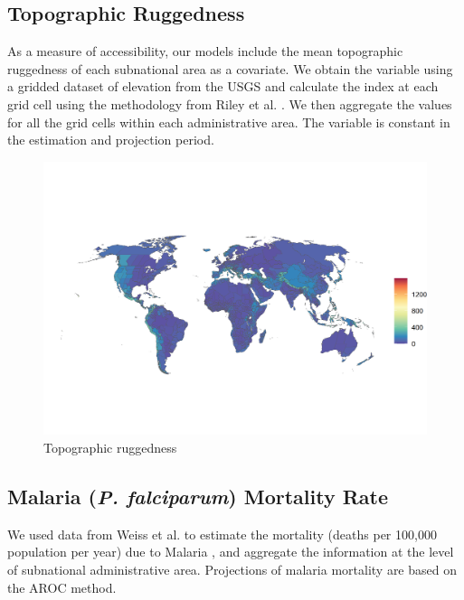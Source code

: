 \documentclass{article}
\begin{document}
\pagebreak
\subsection{Topographic Ruggedness}
As a measure of accessibility, our models include the mean topographic ruggedness of each subnational area as a covariate. We obtain the variable using a gridded dataset of elevation from the USGS \citep{USGS1996} and calculate the index at each grid cell using the methodology from Riley et al. \citep{Riely1999}. We then aggregate the values for all the grid cells within each administrative area. The variable is constant in the estimation and projection period.

\begin{figure}[H]
  \centering
  \includegraphics[width=\linewidth]{img/covars/ruggedness.png}
  \caption{Topographic ruggedness}
\end{figure}

\pagebreak
\subsection{Malaria (\textit{P. falciparum}) Mortality Rate}
We used data from Weiss et al. to estimate the mortality (deaths per 100,000 population per year) due to Malaria \citep{Weiss2019}, and aggregate the information at the level of subnational administrative area. Projections of malaria mortality are based on the AROC method.
\end{document}
